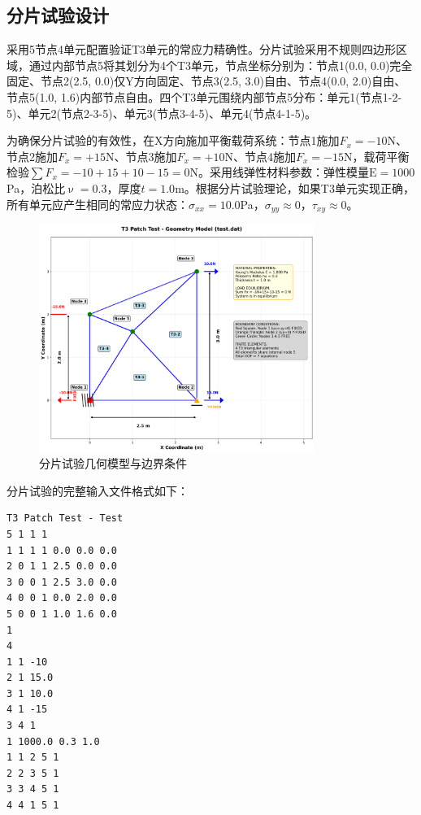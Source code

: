 \documentclass[12pt,a4paper]{article}
\newcommand{\E}{\mathrm{E}}           %
\newcommand{\pnu}{\upnu}             %
\begin{document}

\subsection{分片试验设计}

采用5节点4单元配置验证T3单元的常应力精确性。分片试验采用不规则四边形区域，通过内部节点5将其划分为4个T3单元，节点坐标分别为：节点1(0.0, 0.0)完全固定、节点2(2.5, 0.0)仅Y方向固定、节点3(2.5, 3.0)自由、节点4(0.0, 2.0)自由、节点5(1.0, 1.6)内部节点自由。四个T3单元围绕内部节点5分布：单元1(节点1-2-5)、单元2(节点2-3-5)、单元3(节点3-4-5)、单元4(节点4-1-5)。

为确保分片试验的有效性，在X方向施加平衡载荷系统：节点1施加$F_x = -10$N、节点2施加$F_x = +15$N、节点3施加$F_x = +10$N、节点4施加$F_x = -15$N，载荷平衡检验$\sum F_x = -10 + 15 + 10 - 15 = 0$N。采用线弹性材料参数：弹性模量$\E = 1000$Pa，泊松比$\pnu = 0.3$，厚度$t = 1.0$m。根据分片试验理论，如果T3单元实现正确，所有单元应产生相同的常应力状态：$\sigma_{xx} = 10.0$Pa，$\sigma_{yy} \approx 0$，$\tau_{xy} \approx 0$。

\begin{figure}[H]
\centering
\includegraphics[width=0.8\textwidth]{img/t3_patch_geometry.png}
\caption{分片试验几何模型与边界条件}
\label{fig:t3_patch_test}
\end{figure}

分片试验的完整输入文件格式如下：

\begin{lstlisting}[caption=分片试验输入文件]
T3 Patch Test - Test
5 1 1 1
1 1 1 1 0.0 0.0 0.0
2 0 1 1 2.5 0.0 0.0
3 0 0 1 2.5 3.0 0.0
4 0 0 1 0.0 2.0 0.0
5 0 0 1 1.0 1.6 0.0
1
4
1 1 -10
2 1 15.0
3 1 10.0
4 1 -15
3 4 1
1 1000.0 0.3 1.0
1 1 2 5 1
2 2 3 5 1
3 3 4 5 1
4 4 1 5 1
\end{lstlisting}
\end{document}
